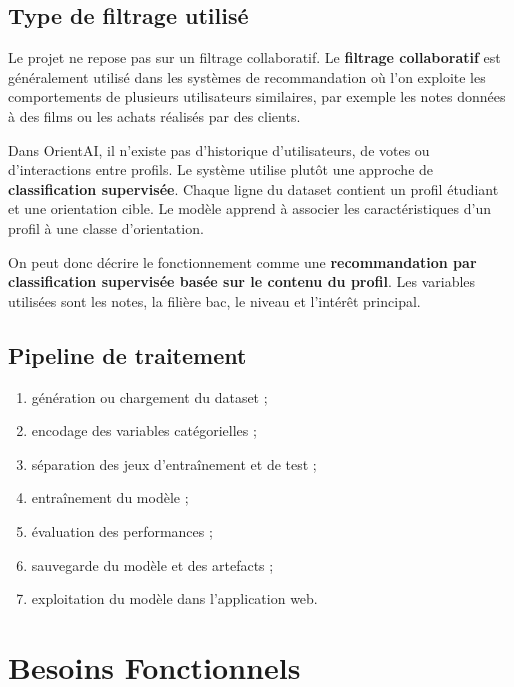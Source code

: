 \documentclass[12pt,a4paper]{report}
\begin{document}
\section{Type de filtrage utilisé}
Le projet ne repose pas sur un filtrage collaboratif. Le \textbf{filtrage collaboratif} est généralement utilisé dans les systèmes de recommandation où l'on exploite les comportements de plusieurs utilisateurs similaires, par exemple les notes données à des films ou les achats réalisés par des clients.

Dans OrientAI, il n'existe pas d'historique d'utilisateurs, de votes ou d'interactions entre profils. Le système utilise plutôt une approche de \textbf{classification supervisée}. Chaque ligne du dataset contient un profil étudiant et une orientation cible. Le modèle apprend à associer les caractéristiques d'un profil à une classe d'orientation.

On peut donc décrire le fonctionnement comme une \textbf{recommandation par classification supervisée basée sur le contenu du profil}. Les variables utilisées sont les notes, la filière bac, le niveau et l'intérêt principal.

\section{Pipeline de traitement}
\begin{enumerate}[label=\arabic*.]
    \item génération ou chargement du dataset ;
    \item encodage des variables catégorielles ;
    \item séparation des jeux d'entraînement et de test ;
    \item entraînement du modèle ;
    \item évaluation des performances ;
    \item sauvegarde du modèle et des artefacts ;
    \item exploitation du modèle dans l'application web.
\end{enumerate}

\chapter{Besoins Fonctionnels}
\end{document}
